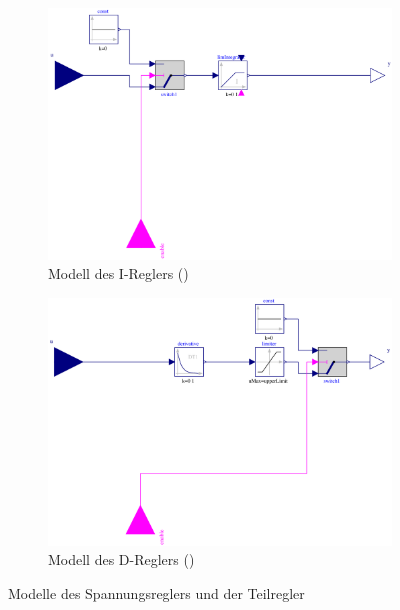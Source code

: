 \begin{figure}
\begin{subfigure}{.49\textwidth}
		\includegraphics{Bilder/IRegler.pdf}
		\caption{Modell des I-Reglers ()}
		\label{fig:I-Regler}    	
    \end{subfigure}
    \begin{subfigure}{.49\textwidth}
	    \includegraphics[]{Bilder/DRegler.pdf}
	    \caption{Modell des D-Reglers ()}
	    \label{fig:D-Regler}    	
    \end{subfigure}
    \caption{Modelle des Spannungsreglers und der Teilregler}
\end{figure}

